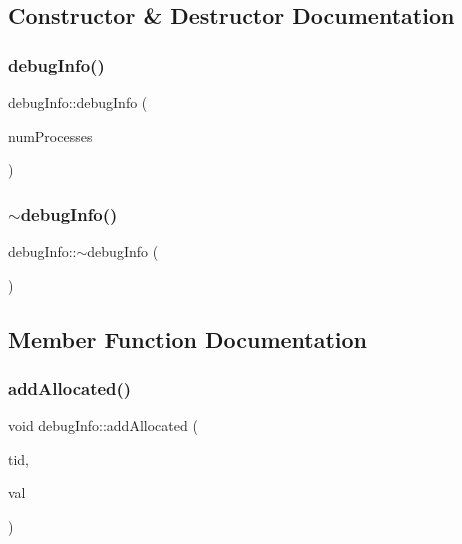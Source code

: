 \subsection{Constructor \& Destructor Documentation}
\mbox{\label{classdebugInfo_a07eeaa03ce8920dff2d9f098266eef64}} 
\subsubsection{\texorpdfstring{debug\+Info()}{debugInfo()}}
{\footnotesize\ttfamily debug\+Info\+::debug\+Info (\begin{DoxyParamCaption}\item[{int}]{num\+Processes }\end{DoxyParamCaption})\hspace{0.3cm}{\ttfamily [inline]}}

\mbox{\label{classdebugInfo_a050eab28da98e5f6565944fde958b042}} 
\subsubsection{\texorpdfstring{$\sim$debug\+Info()}{~debugInfo()}}
{\footnotesize\ttfamily debug\+Info\+::$\sim$debug\+Info (\begin{DoxyParamCaption}{ }\end{DoxyParamCaption})\hspace{0.3cm}{\ttfamily [inline]}}



\subsection{Member Function Documentation}
\mbox{\label{classdebugInfo_a800dfa89a28bf30d1bb19d7489282fed}} 
\subsubsection{\texorpdfstring{add\+Allocated()}{addAllocated()}}
{\footnotesize\ttfamily void debug\+Info\+::add\+Allocated (\begin{DoxyParamCaption}\item[{const int}]{tid,  }\item[{const int}]{val }\end{DoxyParamCaption})\hspace{0.3cm}{\ttfamily [inline]}}

